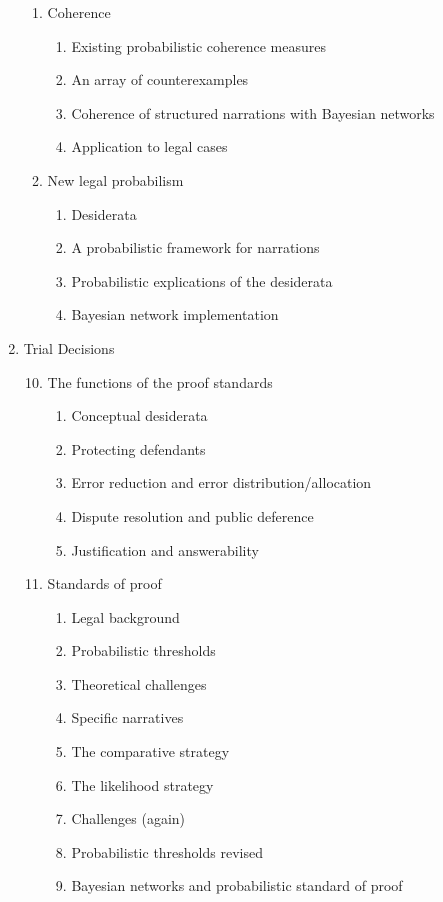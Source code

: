 \documentclass[11pt,dvipsnames,enabledeprecatedfontcommands]{scrartcl}
\begin{document}
\begin{multicols}{2}
\begin{enumerate}
\begin{enumerate}
  \item Coherence
  \begin{enumerate}
  \item  Existing probabilistic coherence measures
  \item  An array of counterexamples
  \item Coherence of structured narrations with Bayesian networks
  \item  Application to legal cases
  \end{enumerate}

  \item  New legal probabilism
    \begin{enumerate}
    \item  Desiderata
    \item  A probabilistic framework for narrations
    \item  Probabilistic explications of the desiderata
    \item  Bayesian network implementation
    \end{enumerate}


\end{enumerate}
\item  Trial Decisions
\begin{enumerate}



\setcounter{enumii}{9}
  \item  The functions of the proof standards
  \begin{enumerate}
  \item  Conceptual desiderata
  \item  Protecting defendants
  \item  Error reduction and error distribution/allocation
  \item  Dispute resolution and public deference
  \item  Justification and answerability
  \end{enumerate}



  \item  Standards of proof
  \begin{enumerate}
  \item  Legal background
  \item  Probabilistic thresholds
  \item  Theoretical challenges
  \item  Specific narratives
  \item The comparative strategy
  \item  The likelihood strategy
  \item Challenges (again)
  \item Probabilistic thresholds revised
  \item  Bayesian networks and probabilistic standard of proof
  \end{enumerate}


\end{enumerate}
\end{enumerate}
\end{multicols}
\end{document}
